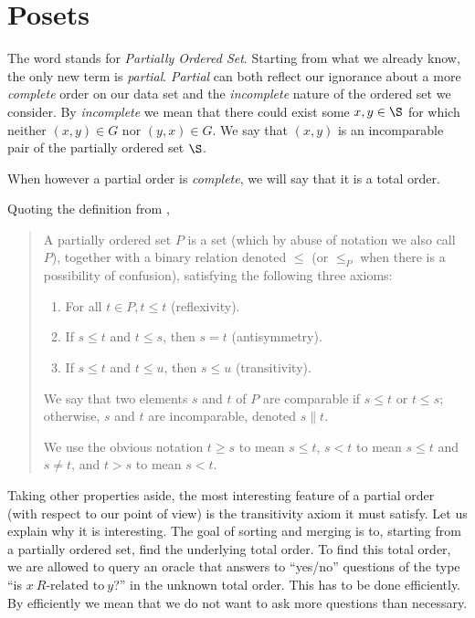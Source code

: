 \section{Posets}

The word  stands for \emph{Partially Ordered Set}. Starting from
what we already know, the only new term is \emph{partial}. \emph{Partial} can
both reflect our ignorance about a more \emph{complete} order on our data set
and the \emph{incomplete} nature of the ordered set we consider. By
\emph{incomplete} we mean that there could exist some $x, y \in \S$ for which
neither $(x, y) \in G$ nor $(y, x) \in G$. We say that $(x,y)$ is an
incomparable pair of the partially ordered set \(\S\).


When however a partial order is \emph{complete}, we will say that it is a total
order.

Quoting the definition from \citet*{Stanley:2011:ECV:2124415},

\begin{quotation}

A partially ordered set $P$ is a set (which by abuse of notation we also call
$P$), together with a binary relation denoted $\leq$ (or $\leq_P$ when there is
a possibility of confusion), satisfying the following three axioms:

\begin{enumerate}
\item For all $t \in P, t \leq t$ (reflexivity).
\item If $s \leq t$ and $t \leq s$, then $s = t$ (antisymmetry).
\item If $s \leq t$ and $t \leq u$, then $s \leq u$ (transitivity).
\end{enumerate}

We say that two elements $s$ and $t$ of $P$ are comparable if $s \leq t$ or $t
\leq s$; otherwise, $s$ and $t$ are incomparable, denoted $s \parallel t$.

We use the obvious notation $t \geq s$ to mean $s \leq t$, $s < t$ to mean $s
\leq t$ and $s \neq t$, and $t > s$ to mean $s < t$.

\end{quotation}

Taking other properties aside, the most interesting feature of a partial order
(with respect to our point of view) is the transitivity axiom it must satisfy.
Let us explain why it is interesting. The goal of sorting and merging is to,
starting from a partially ordered set, find the underlying total order. To find
this total order, we are allowed to query an oracle that answers to ``yes/no''
questions of the type ``is $x~R\text{-related to}~y$?'' in the unknown total
order. This has to be done efficiently. By efficiently we mean that we do not
want to ask more questions than necessary.


